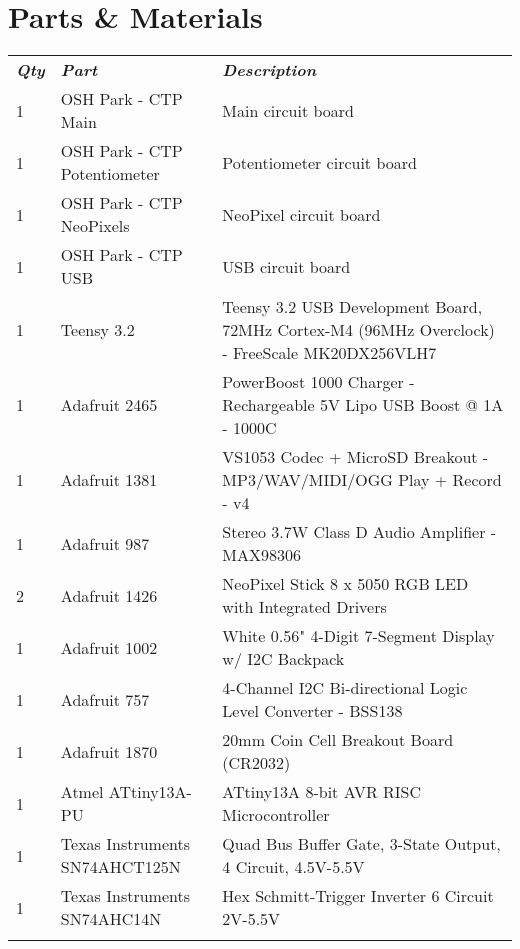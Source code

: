 \chapter{Parts \& Materials}

\tiny
{}
\begin{longtabu}{X[1,c,m] X[6,c,m] X[9,l,m]}
  \thrule
  \textit{\bfseries\normalsize Qty} & \textit{\bfseries\normalsize Part} & \textit{\bfseries\normalsize Description} \\ \mrule

  1 & OSH Park - CTP Main & Main circuit board \\
  1 & OSH Park - CTP Potentiometer & Potentiometer circuit board \\
  1 & OSH Park - CTP NeoPixels & NeoPixel circuit board \\
  1 & OSH Park - CTP USB & USB circuit board \\ \mrule

  1 & Teensy 3.2 & Teensy 3.2 USB Development Board, 72MHz Cortex-M4 (96MHz Overclock) - FreeScale MK20DX256VLH7 \\
  1 & Adafruit 2465 & PowerBoost 1000 Charger - Rechargeable 5V Lipo USB Boost @ 1A - 1000C \\
  1 & Adafruit 1381 & VS1053 Codec + MicroSD Breakout - MP3/WAV/MIDI/OGG Play + Record - v4 \\
  1 & Adafruit 987 & Stereo 3.7W Class D Audio Amplifier - MAX98306 \\
  2 & Adafruit 1426 & NeoPixel Stick 8 x 5050 RGB LED with Integrated Drivers \\
  1 & Adafruit 1002 & White 0.56" 4-Digit 7-Segment Display w/ I2C Backpack \\
  1 & Adafruit 757 & 4-Channel I2C Bi-directional Logic Level Converter - BSS138 \\
  1 & Adafruit 1870 & 20mm Coin Cell Breakout Board (CR2032) \\ \mrule

  1 & Atmel ATtiny13A-PU & ATtiny13A 8-bit AVR RISC Microcontroller \\
  1 & Texas Instruments SN74AHCT125N & Quad Bus Buffer Gate, 3-State Output, 4 Circuit, 4.5V-5.5V \\
  1 & Texas Instruments SN74AHC14N & Hex Schmitt-Trigger Inverter 6 Circuit 2V-5.5V \\ \mrule


\end{longtabu}
